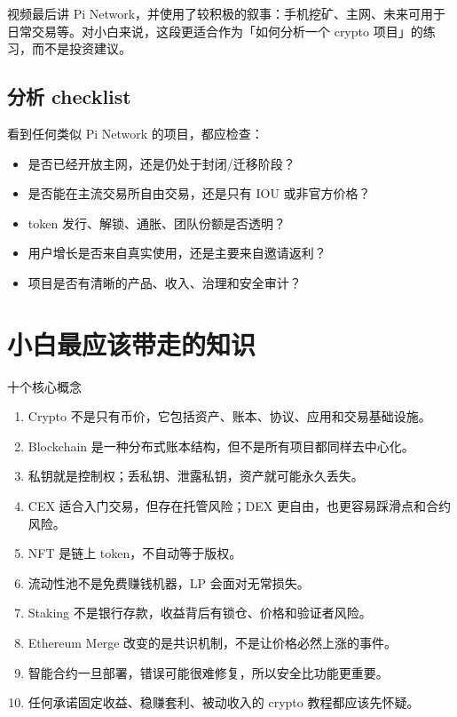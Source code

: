 \documentclass[UTF8,11pt]{ctexart}
\begin{document}
视频最后讲 Pi Network，并使用了较积极的叙事：手机挖矿、主网、未来可用于日常交易等。对小白来说，这段更适合作为「如何分析一个 crypto 项目」的练习，而不是投资建议。

\subsection{分析 checklist}

看到任何类似 Pi Network 的项目，都应检查：
\begin{itemize}
  \item 是否已经开放主网，还是仍处于封闭/迁移阶段？
  \item 是否能在主流交易所自由交易，还是只有 IOU 或非官方价格？
  \item token 发行、解锁、通胀、团队份额是否透明？
  \item 用户增长是否来自真实使用，还是主要来自邀请返利？
  \item 项目是否有清晰的产品、收入、治理和安全审计？
\end{itemize}

\section{小白最应该带走的知识}

\begin{keybox}{十个核心概念}
\begin{enumerate}
  \item Crypto 不是只有币价，它包括资产、账本、协议、应用和交易基础设施。
  \item Blockchain 是一种分布式账本结构，但不是所有项目都同样去中心化。
  \item 私钥就是控制权；丢私钥、泄露私钥，资产就可能永久丢失。
  \item CEX 适合入门交易，但存在托管风险；DEX 更自由，也更容易踩滑点和合约风险。
  \item NFT 是链上 token，不自动等于版权。
  \item 流动性池不是免费赚钱机器，LP 会面对无常损失。
  \item Staking 不是银行存款，收益背后有锁仓、价格和验证者风险。
  \item Ethereum Merge 改变的是共识机制，不是让价格必然上涨的事件。
  \item 智能合约一旦部署，错误可能很难修复，所以安全比功能更重要。
  \item 任何承诺固定收益、稳赚套利、被动收入的 crypto 教程都应该先怀疑。
\end{enumerate}
\end{keybox}
\end{document}
